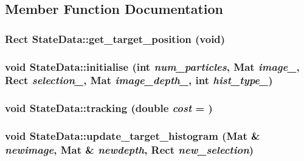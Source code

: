 \subsection{Member Function Documentation}
\hypertarget{classStateData_aa2c20a09eecd353d4454e707ac17f143}{
\subsubsection[{get\_\-target\_\-position}]{\setlength{\rightskip}{0pt plus 5cm}Rect StateData::get\_\-target\_\-position (void)}}
\label{classStateData_aa2c20a09eecd353d4454e707ac17f143}
\hypertarget{classStateData_a3fe497a97247af50f8eb876d6284da69}{
\subsubsection[{initialise}]{\setlength{\rightskip}{0pt plus 5cm}void StateData::initialise (int {\em num\_\-particles}, \/  Mat {\em image\_\-}, \/  Rect {\em selection\_\-}, \/  Mat {\em image\_\-depth\_\-}, \/  int {\em hist\_\-type\_\-})}}
\label{classStateData_a3fe497a97247af50f8eb876d6284da69}
\hypertarget{classStateData_af4bbe24b619137cba16b7b85970e1bd7}{
\subsubsection[{tracking}]{\setlength{\rightskip}{0pt plus 5cm}void StateData::tracking (double {\em cost} = {})}}
\label{classStateData_af4bbe24b619137cba16b7b85970e1bd7}
\hypertarget{classStateData_a2b26ea86bd2d1d3d37debec000fefa01}{
\subsubsection[{update\_\-target\_\-histogram}]{\setlength{\rightskip}{0pt plus 5cm}void StateData::update\_\-target\_\-histogram (Mat \& {\em newimage}, \/  Mat \& {\em newdepth}, \/  Rect {\em new\_\-selection})}}
\label{classStateData_a2b26ea86bd2d1d3d37debec000fefa01}


